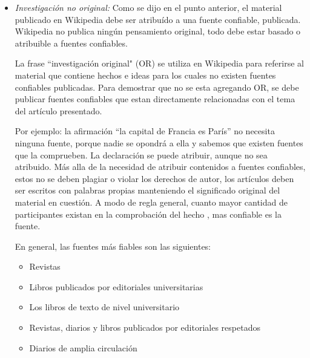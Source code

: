 \begin{itemize}
Por otro lado, las fuentes que generalmente no son confiables son:

\begin{itemize}
\item Fuentes cuestionables
\item Fuentes auto publicadas
\item Fuentes de auto publicadas o cuestionables como fuentes en s\'i mismas
\item Wikipedia misma o sitios que reflejan contenidos de Wikipedia
\end{itemize}


\item \emph{Investigaci\'on no original:} Como se dijo en el punto anterior, el material publicado en Wikipedia debe ser atribu\'ido a una fuente confiable, publicada. Wikipedia no publica ning\'un pensamiento original, todo debe estar basado o atribuible a fuentes confiables.

La frase ``investigaci\'on original" (OR) se utiliza en Wikipedia para referirse al material que contiene hechos e ideas para los cuales no existen fuentes confiables publicadas.
Para demostrar que no se esta agregando OR, se debe publicar fuentes confiables que estan directamente relacionadas con el tema del art\'iculo presentado.

Por ejemplo: la afirmaci\'on ``la capital de Francia es Par\'is''  no necesita ninguna fuente, porque nadie se opondr\'a a ella y sabemos que existen fuentes que la comprueben. La declaraci\'on se puede atribuir, aunque no sea atribuido.
M\'as alla de la necesidad de atribuir contenidos a fuentes confiables, estos no se deben plagiar o violar los derechos de autor, los art\'iculos deben ser escritos con palabras propias manteniendo el significado original del material en cuesti\'on.
A modo de regla general, cuanto mayor cantidad de participantes existan en la comprobaci\'on del hecho , mas confiable es la fuente.

En general, las fuentes m\'as fiables son las siguientes:

\begin{itemize}
\item Revistas
\item Libros publicados por editoriales universitarias
\item Los libros de texto de nivel universitario
\item Revistas, diarios y libros publicados por editoriales respetados
\item Diarios de amplia circulaci\'on
\end{itemize}



\end{itemize}
